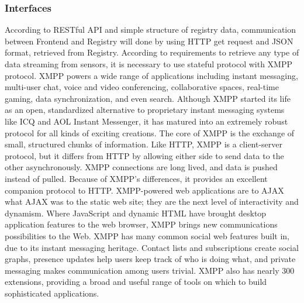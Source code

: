     \subsubsection{Interfaces}
    According to RESTful API and simple structure of registry data, communication between Frontend and Registry will done by using HTTP get request and JSON format, retrieved from Registry.
    \newline
    According to requirements to retrieve any type of data streaming from sensors, it is necessary to use stateful protocol with XMPP protocol\cite{XMPPbook}.
    XMPP powers a wide range of applications including instant messaging, multi-user chat, voice and video conferencing, collaborative spaces, real-time gaming, data synchronization, and even search. Although XMPP started its life as an open, standardized alternative to proprietary instant messaging systems like ICQ and AOL Instant Messenger, it has matured into an extremely robust protocol for all kinds of exciting creations.
    \newline
    The core of XMPP is the exchange of small, structured chunks of information. Like HTTP, XMPP is a client-server protocol, but it differs from HTTP by allowing either side to send data to the other asynchronously. XMPP connections are long lived, and data is pushed instead of pulled. Because of XMPP’s differences, it provides an excellent companion protocol to HTTP. XMPP-powered web applications are to AJAX what AJAX was to the static web site; they are the next level of interactivity and dynamism. Where JavaScript and dynamic HTML have brought desktop application features to the web browser, XMPP brings new communications possibilities to the Web. XMPP has many common social web features built in, due to its instant messaging heritage. Contact lists and subscriptions create social graphs, presence updates help users keep track of who is doing what, and private messaging makes communication among users trivial. XMPP also has nearly 300 extensions, providing a broad and useful range of tools on which to build sophisticated applications. 
    \newline
